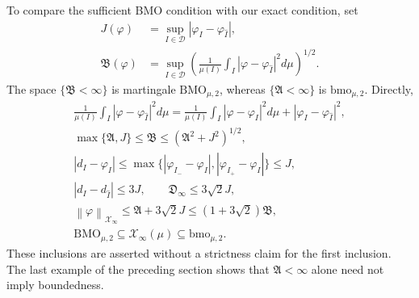 \documentclass[11pt]{amsart}
\newcommand{\D}{\mathcal D}
\newcommand{\X}{\mathcal X}
\newcommand{\norm}[1]{\left\|#1\right\|}
\begin{document}
To compare the sufficient BMO condition with our exact condition, set
\[
 \begin{aligned}
 J(\varphi)&=\sup_{I\in\D}|\varphi_I-\varphi_{\widehat I}|,\\
 \mathfrak B(\varphi)&=
 \sup_{I\in\D}\left(\frac1{\mu(I)}
               \int_I|\varphi-\varphi_{\widehat I}|^2d\mu\right)^{1/2}.
 \end{aligned}
\]
The space $\{\mathfrak B<\infty\}$ is martingale
$\mathrm{BMO}_{\mu,2}$, whereas $\{\mathfrak A<\infty\}$ is
$\mathrm{bmo}_{\mu,2}$. Directly,
\begin{gather*}
 \frac1{\mu(I)}\int_I|\varphi-\varphi_{\widehat I}|^2d\mu
 =\frac1{\mu(I)}\int_I|\varphi-\varphi_I|^2d\mu
                     +|\varphi_I-\varphi_{\widehat I}|^2,\\
 \max\{\mathfrak A,J\}\le\mathfrak B
                   \le(\mathfrak A^2+J^2)^{1/2},\\
 |d_I-\varphi_I|
  \le\max\{|\varphi_{I_-}-\varphi_I|,
                   |\varphi_{I_+}-\varphi_I|\}\le J,\\
 |d_I-d_{\widehat I}|\le3J,\qquad
 \mathfrak D_\infty\le3\sqrt2J,\\
 \norm{\varphi}_{\X_\infty}
  \le\mathfrak A+3\sqrt2J\le(1+3\sqrt2)\mathfrak B,\\
 \mathrm{BMO}_{\mu,2}\subseteq\X_\infty(\mu)
                         \subseteq\mathrm{bmo}_{\mu,2}.
\end{gather*}
These inclusions are asserted without a strictness claim for the
first inclusion. The last example of the preceding section shows
that $\mathfrak A<\infty$ alone need not imply boundedness.
\end{document}
